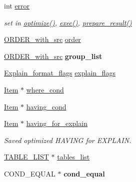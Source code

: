 \begin{DoxyCompactItemize}
\mbox{\label{classJOIN_a3af313be65a65eb809cb2f11e6e84b0b}} 
int \mbox{\hyperlink{classJOIN_a3af313be65a65eb809cb2f11e6e84b0b}{error}}
\begin{DoxyCompactList}\small\item\em set in \mbox{\hyperlink{group__Query__Optimizer_ga7f722315c64ce97cff639d705107c660}{optimize()}}, \mbox{\hyperlink{group__Query__Executor_ga31581f58624b85919d7c6cd632157929}{exec()}}, \mbox{\hyperlink{group__Query__Optimizer_gabed62f6e6cc8f6d042c806a154ea7137}{prepare\+\_\+result()}} \end{DoxyCompactList}\item 
\mbox{\hyperlink{classJOIN_1_1ORDER__with__src}{O\+R\+D\+E\+R\+\_\+with\+\_\+src}} \mbox{\hyperlink{classJOIN_ac06839682aae707b0e1d4fafd53abaf5}{order}}
\item 
\mbox{\label{classJOIN_a9172112162601c387e3bb4feaaaedc3c}} 
\mbox{\hyperlink{classJOIN_1_1ORDER__with__src}{O\+R\+D\+E\+R\+\_\+with\+\_\+src}} {\bfseries group\+\_\+list}
\item 
\mbox{\hyperlink{classExplain__format__flags}{Explain\+\_\+format\+\_\+flags}} \mbox{\hyperlink{classJOIN_a547b3eff0d36ad2366592b7fd575cd88}{explain\+\_\+flags}}
\item 
\mbox{\hyperlink{classItem}{Item}} $\ast$ \mbox{\hyperlink{classJOIN_af432939b3df4197b8ebdc46ce8c82e4d}{where\+\_\+cond}}
\item 
\mbox{\hyperlink{classItem}{Item}} $\ast$ \mbox{\hyperlink{classJOIN_a69dc26a844c4680287a0a5281881073a}{having\+\_\+cond}}
\item 
\mbox{\label{classJOIN_a618d5eab4f68e0f8d1e3ca58d3aff4d8}} 
\mbox{\hyperlink{classItem}{Item}} $\ast$ \mbox{\hyperlink{classJOIN_a618d5eab4f68e0f8d1e3ca58d3aff4d8}{having\+\_\+for\+\_\+explain}}
\begin{DoxyCompactList}\small\item\em Saved optimized H\+A\+V\+I\+NG for E\+X\+P\+L\+A\+IN. \end{DoxyCompactList}\item 
\mbox{\hyperlink{structTABLE__LIST}{T\+A\+B\+L\+E\+\_\+\+L\+I\+ST}} $\ast$ \mbox{\hyperlink{classJOIN_a6ebe9f41a938e8bcf950852141aa5cad}{tables\+\_\+list}}
\item 
\mbox{\label{classJOIN_a2cfe2d5740ee6498dfd34aca71a032de}} 
C\+O\+N\+D\+\_\+\+E\+Q\+U\+AL $\ast$ {\bfseries cond\+\_\+equal}

\end{DoxyCompactItemize}
